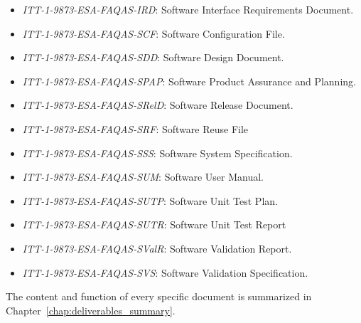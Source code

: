 \begin{itemize}

	\item \emph{ITT-1-9873-ESA-FAQAS-IRD}: Software Interface Requirements Document.

	\item \emph{ITT-1-9873-ESA-FAQAS-SCF}: Software Configuration File.

	\item \emph{ITT-1-9873-ESA-FAQAS-SDD}: Software Design Document.

	\item \emph{ITT-1-9873-ESA-FAQAS-SPAP}: Software Product Assurance and Planning.

	\item \emph{ITT-1-9873-ESA-FAQAS-SRelD}: Software Release Document.

	\item \emph{ITT-1-9873-ESA-FAQAS-SRF}: Software Reuse File

	\item \emph{ITT-1-9873-ESA-FAQAS-SSS}: Software System Specification.

	\item \emph{ITT-1-9873-ESA-FAQAS-SUM}: Software User Manual.

	\item \emph{ITT-1-9873-ESA-FAQAS-SUTP}: Software Unit Test Plan.

	\item \emph{ITT-1-9873-ESA-FAQAS-SUTR}: Software Unit Test Report

	\item \emph{ITT-1-9873-ESA-FAQAS-SValR}: Software Validation Report.

	\item \emph{ITT-1-9873-ESA-FAQAS-SVS}: Software Validation Specification.

\end{itemize}

The content and function of every specific document is summarized in Chapter~\ref{chap:deliverables_summary}.
